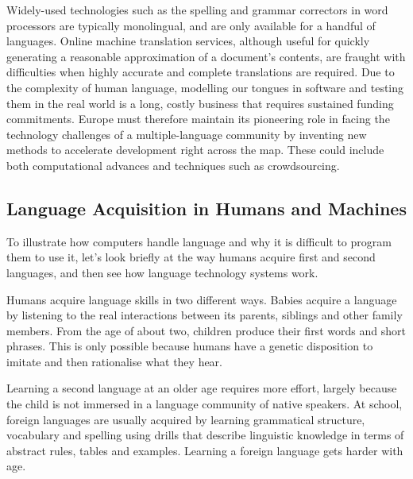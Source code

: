 \begin{multicols}{2}
    
    Widely-used technologies such as the spelling and grammar correctors in word processors are typically monolingual, and are only available for a handful of languages. Online machine translation services, although useful for quickly generating a reasonable approximation of a document’s contents, are fraught with difficulties when highly accurate and complete translations are required. Due to the complexity of human language, modelling our tongues in software and testing them in the real world is a long, costly business that requires sustained funding commitments. Europe must therefore maintain its pioneering role in facing the technology challenges of a multiple-language community by inventing new methods to accelerate development right across the map. These could include both computational advances and techniques such as crowdsourcing.

 
\subsection{Language Acquisition in Humans and Machines}
    To illustrate how computers handle language and why it is difficult to program them to use it, let’s look briefly at the way humans acquire first and second languages, and then see how language technology systems work. 

    Humans acquire language skills in two different ways. Babies acquire a language by listening to the real interactions between its parents, siblings and other family members. From the age of about two, children produce their first words and short phrases. This is only possible because humans have a genetic disposition to imitate and then rationalise what they hear. 

    Learning a second language at an older age requires more effort, largely because the child is not immersed in a language community of native speakers. At school, foreign languages are usually acquired by learning grammatical structure, vocabulary and spelling using drills that describe linguistic knowledge in terms of abstract rules, tables and examples. Learning a foreign language gets harder with age.



\end{multicols}
